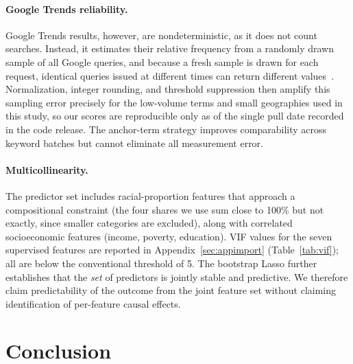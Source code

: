 \documentclass[11pt]{article}
\begin{document}
\paragraph{Google Trends reliability.} Google Trends results, however, are nondeterministic, as it does not count searches. Instead, it estimates their relative frequency from a randomly drawn sample of all Google queries, and because a fresh sample is drawn for each request, identical queries issued at different times can return different values~\citep{holzl2025, googletrends}. Normalization, integer rounding, and threshold suppression then amplify this sampling error precisely for the low-volume terms and small geographies used in this study, so our scores are reproducible only as of the single pull date recorded in the code release. The anchor-term strategy improves comparability across keyword batches but cannot eliminate all measurement error.

\paragraph{Multicollinearity.} The predictor set includes racial-proportion features that approach a compositional constraint (the four shares we use sum close to 100\% but not exactly, since smaller categories are excluded), along with correlated socioeconomic features (income, poverty, education). VIF values for the seven supervised features are reported in Appendix~\ref{sec:appimport} (Table~\ref{tab:vif}); all are below the conventional threshold of 5. The bootstrap Lasso further establishes that the \emph{set} of predictors is jointly stable and predictive. We therefore claim predictability of the outcome from the joint feature set without claiming identification of per-feature causal effects.

\section{Conclusion}
\end{document}
